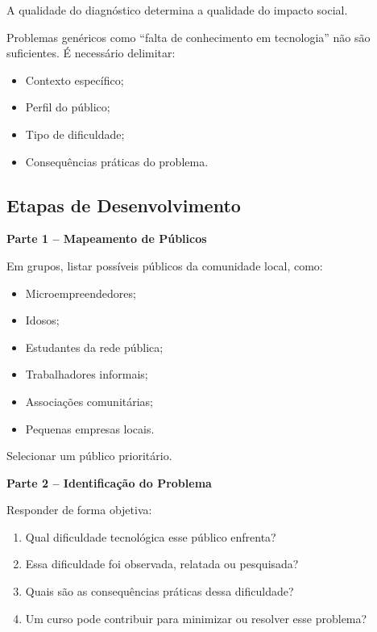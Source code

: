 \documentclass[12pt,a4paper]{article}
\begin{document}
A qualidade do diagnóstico determina a qualidade do impacto social.

Problemas genéricos como “falta de conhecimento em tecnologia” não são suficientes. 
É necessário delimitar:

\begin{itemize}
    \item Contexto específico;
    \item Perfil do público;
    \item Tipo de dificuldade;
    \item Consequências práticas do problema.
\end{itemize}

\subsection*{Etapas de Desenvolvimento}

\textbf{Parte 1 – Mapeamento de Públicos}

Em grupos, listar possíveis públicos da comunidade local, como:

\begin{itemize}
    \item Microempreendedores;
    \item Idosos;
    \item Estudantes da rede pública;
    \item Trabalhadores informais;
    \item Associações comunitárias;
    \item Pequenas empresas locais.
\end{itemize}

Selecionar um público prioritário.

\bigskip

\textbf{Parte 2 – Identificação do Problema}

Responder de forma objetiva:

\begin{enumerate}
    \item Qual dificuldade tecnológica esse público enfrenta?
    \item Essa dificuldade foi observada, relatada ou pesquisada?
    \item Quais são as consequências práticas dessa dificuldade?
    \item Um curso pode contribuir para minimizar ou resolver esse problema?
\end{enumerate}

\bigskip
\end{document}

